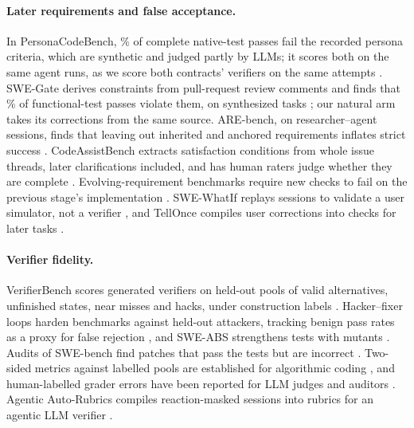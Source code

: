 \paragraph{Later requirements and false acceptance.} In PersonaCodeBench, \% of complete native-test passes fail the recorded persona criteria, which are synthetic and judged partly by LLMs; it scores both on the same agent runs, as we score both contracts' verifiers on the same attempts \cite{wang2026personacodebench}. SWE-Gate derives constraints from pull-request review comments and finds that \% of functional-test passes violate them, on synthesized tasks \cite{he2026swegate}; our natural arm takes its corrections from the same source. ARE-bench, on researcher--agent sessions, finds that leaving out inherited and anchored requirements inflates strict success \cite{lin2026arebench}. CodeAssistBench extracts satisfaction conditions from whole issue threads, later clarifications included, and has human raters judge whether they are complete \cite{kim2025codeassistbench}. Evolving-requirement benchmarks require new checks to fail on the previous stage's implementation \cite{feng2026benchmarking,zhan2025sreval}. SWE-WhatIf replays sessions to validate a user simulator, not a verifier \cite{kim2026swewhatif}, and TellOnce compiles user corrections into checks for later tasks \cite{zhou2026tellonce}.

\paragraph{Verifier fidelity.} VerifierBench scores generated verifiers on held-out pools of valid alternatives, unfinished states, near misses and hacks, under construction labels \cite{yin2026verifierbench}. Hacker--fixer loops harden benchmarks against held-out attackers, tracking benign pass rates as a proxy for false rejection \cite{zhong2026hardening}, and SWE-ABS strengthens tests with mutants \cite{yu2026sweabs}. Audits of SWE-bench find patches that pass the tests but are incorrect \cite{wang2025are,yu2025utboost}. Two-sided metrics against labelled pools are established for algorithmic coding \cite{wang2025codecontests,he2025hardtestgen}, and human-labelled grader errors have been reported for LLM judges and auditors \cite{min2026tracedance,lv2026realclawbench}. Agentic Auto-Rubrics compiles reaction-masked sessions into rubrics for an agentic LLM verifier \cite{anonymous2026agentic}.


